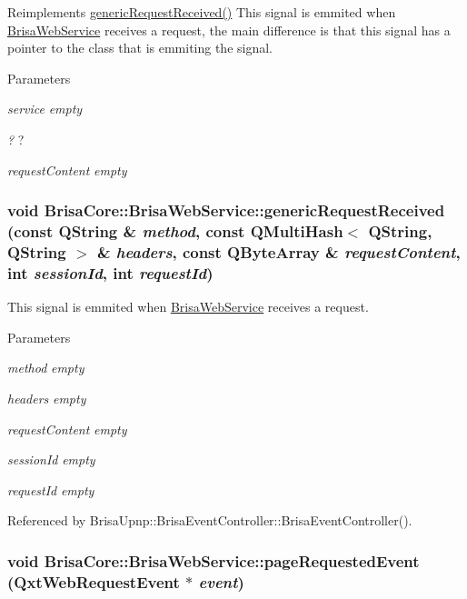 Reimplements \hyperlink{classBrisaCore_1_1BrisaWebService_ad94a4a9cd45a90dc56559ac86728c61b}{genericRequestReceived()} This signal is emmited when \hyperlink{classBrisaCore_1_1BrisaWebService}{BrisaWebService} receives a request, the main difference is that this signal has a pointer to the class that is emmiting the signal. 
\begin{DoxyParams}{Parameters}
\item[{\em service}]{\itshape empty\/} \item[{\em ?}]? \item[{\em requestContent}]{\itshape empty\/} \end{DoxyParams}
\hypertarget{classBrisaCore_1_1BrisaWebService_ad94a4a9cd45a90dc56559ac86728c61b}{
\subsubsection[{genericRequestReceived}]{\setlength{\rightskip}{0pt plus 5cm}void BrisaCore::BrisaWebService::genericRequestReceived (const QString \& {\em method}, \/  const QMultiHash$<$ QString, QString $>$ \& {\em headers}, \/  const QByteArray \& {\em requestContent}, \/  int {\em sessionId}, \/  int {\em requestId})}}
\label{classBrisaCore_1_1BrisaWebService_ad94a4a9cd45a90dc56559ac86728c61b}


This signal is emmited when \hyperlink{classBrisaCore_1_1BrisaWebService}{BrisaWebService} receives a request. 
\begin{DoxyParams}{Parameters}
\item[{\em method}]{\itshape empty\/} \item[{\em headers}]{\itshape empty\/} \item[{\em requestContent}]{\itshape empty\/} \item[{\em sessionId}]{\itshape empty\/} \item[{\em requestId}]{\itshape empty\/} \end{DoxyParams}


Referenced by BrisaUpnp::BrisaEventController::BrisaEventController().\hypertarget{classBrisaCore_1_1BrisaWebService_afebcc6819b39a28ddd06bb78ec7d26a0}{
\subsubsection[{pageRequestedEvent}]{\setlength{\rightskip}{0pt plus 5cm}void BrisaCore::BrisaWebService::pageRequestedEvent (QxtWebRequestEvent $\ast$ {\em event})}}
\label{classBrisaCore_1_1BrisaWebService_afebcc6819b39a28ddd06bb78ec7d26a0}


